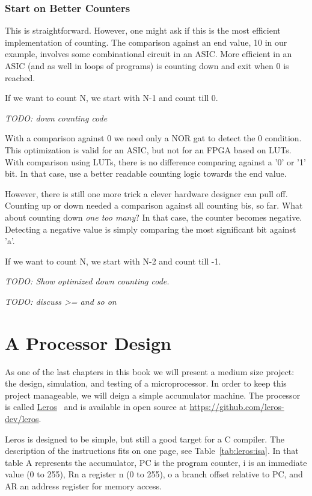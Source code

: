 \documentclass[%
    10pt, %
    headinclude, footexclude,
    openright, %
    notitlepage,
    cleardoubleempty,
    headsepline,
    pointlessnumbers,
    bibtotoc, idxtotoc,
    ]{scrbook}
\newcommand{\todo}[1]{{\emph{TODO: #1}}}
\newcommand{\myref}[2]{\href{#1}{#2}}
\begin{document}
\subsection*{Start on Better Counters}

This is straightforward. However, one might ask if this is the most efficient
implementation of counting. The comparison against an end value, 10 in our
example, involves some combinational circuit in an ASIC. More efficient in an
ASIC (and as well in loops of programs) is counting down and exit when 0
is reached.

If we want to count N, we start with N-1 and count till 0.

\todo{down counting code}

With a comparison against 0 we need only a NOR gat to detect the 0 condition.
This optimization is valid for an ASIC, but not for an FPGA based on LUTs.
With comparison using LUTs, there is no difference comparing against a '0' or
'1' bit. In that case, use a better readable counting logic towards the end value.

However, there is still one more trick a clever hardware designer can pull off.
Counting up or down needed a comparison against all counting bis, so far.
What about counting down \emph{one too many}? In that case, the counter
becomes negative. Detecting a negative value is simply comparing the
most significant bit against 'a'.

If we want to count N, we start with N-2 and count till -1.

\todo{Show optimized down counting code.}

\todo{discuss >= and so on}

\chapter{A Processor Design}

As one of the last chapters in this book we will present a medium size project:
the design, simulation, and testing of a microprocessor.
In order to keep this project manageable, we will deign a simple accumulator
machine.
The processor is called \myref{https://leros-dev.github.io/}{Leros}~\cite{leros:arcs2019}
and is available in open source at \url{https://github.com/leros-dev/leros}.

Leros is designed to be simple, but still a good target for a C compiler.
The description of the instructions fits on one page, see Table~\ref{tab:leros:isa}.
In that table A represents the accumulator, PC is the program counter,
i is an immediate value (0 to 255), Rn a register
n (0 to 255), o a branch offset relative to PC, and AR an address register for memory access.
\end{document}

